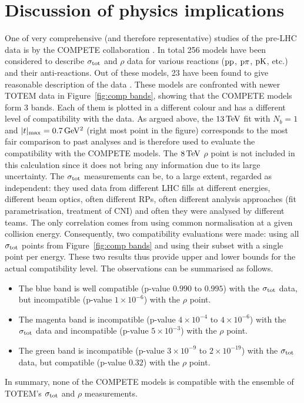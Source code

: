 \section{Discussion of physics implications}
\label{sec:discussion}

One of very comprehensive (and therefore representative) studies of the pre-LHC data is by the COMPETE collaboration \cite{compete}. In total 256 models have been considered to describe $\sigma_{\rm tot}$ and $\rho$ data for various reactions ($\rm pp$, $\rm p\pi$, $\rm pK$, etc.) and their anti-reactions. Out of these models, 23 have been found to give reasonable description of the data \cite{compete-details}. These models are confronted with newer TOTEM data in Figure~\ref{fig:comp bands}, showing that the COMPETE models form 3 bands. Each of them is plotted in a different colour and has a different level of compatibility with the data. As argued above, the $13\,{\rm TeV}$ fit with $N_b=1$ and $|t|_{\rm max} = 0.7\,{\rm GeV^2}$ (right most point in the figure) corresponds to the most fair comparison to past analyses and is therefore used to evaluate the compatibility with the COMPETE models. The $8\,{\rm TeV}$ $\rho$ point is not included in this calculation since it does not bring any information due to its large uncertainty. The $\sigma_{\rm tot}$ measurements can be, to a large extent, regarded as independent: they used data from different LHC fills at different energies, different beam optics, often different RPs, often different analysis approaches (fit parametrisation, treatment of CNI) and often they were analysed by different teams. The only correlation comes from using common normalisation at a given collision energy. Consequently, two compatibility evaluations were made: using all $\sigma_{\rm tot}$ points from Figure~\ref{fig:comp bands} and using their subset with a single point per energy. These two results thus provide upper and lower bounds for the actual compatibility level. The observations can be summarised as follows.
\begin{itemize}[noitemsep,topsep=0pt]
\item The blue band is well compatible (p-value $0.990$ to $0.995$) with the $\sigma_{\rm tot}$ data, but incompatible (p-value $1\times10^{-6}$) with the $\rho$ point.
\item The magenta band is incompatible (p-value $4\times10^{-4}$ to $4\times10^{-6}$) with the $\sigma_{\rm tot}$ data and incompatible (p-value $5\times10^{-3}$) with the $\rho$ point.
\item The green band is incompatible (p-value $3\times10^{-9}$ to $2\times10^{-19}$) with the $\sigma_{\rm tot}$ data, but compatible (p-value $0.32$) with the $\rho$ point.
\end{itemize}
In summary, none of the COMPETE models is compatible with the ensemble of TOTEM's $\sigma_{\rm tot}$ and $\rho$ measurements.

